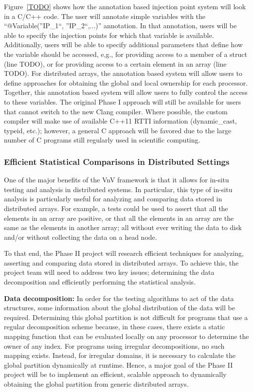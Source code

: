 Figure~\ref{TODO} shows how the annotation based injection point system will look in a C/C++ code. The user will annotate simple variables with the ``@Variable(''IP\_1``, ''IP\_2``,...)'' annotation. In that annotation, users will be able to specify the injection points for which that variable is available. Additionally, users will be able to specify additional parameters that define how the variable should be accessed, e,g., for providing access to a member of a struct (line TODO), or for providing access to a certain element in an array (line TODO). For distributed arrays, the annotation based system will allow users to define approaches for obtaining the global and local ownership for each processor. Together, this annotation based system will allow users to fully control the access to these variables. The original Phase I approach will still be available for users that cannot switch to the new Clang compiler. Where possible, the custom compiler will make use of available C++11 RTTI information (dynamic\_cast, typeid, etc.); however, a general C approach will be favored due to the large number of C programs still regularly used in scientific computing. 


\subsubsection{Efficient Statistical Comparisons in Distributed Settings} 

One of the major benefits of the VnV framework is that it allows for in-situ testing and analysis in distributed systems. In particular, this type of in-situ analysis is particularly useful for analyzing and comparing data stored in distributed arrays. For example, a tests could be used to assert that all the elements in an array are positive, or that all the elements in an array are the same as the elements in another array; all without ever writing the data to disk and/or without collecting the data on a head node. 

To that end, the Phase II project will research efficient techniques for analyzing, asserting and comparing data stored in distributed arrays. To achieve this, the project team will need to address two key issues; determining the data decomposition and efficiently performing the statistical analysis. 

{\bf Data decomposition:} In order for the testing algorithms to act of the data structures, some information about the global distribution of the data will be required. Determining this global partition is not difficult for programs that use a regular decomposition scheme because, in these cases, there exists a static mapping function that can be evaluated locally on any processor to determine the owner of any index. For programs using irregular decompositions, no such mapping exists. Instead, for irregular domains, it is necessary to calculate the global partition dynamically at runtime. Hence, a major goal of the Phase II project will be to implement an efficient, scalable approach to dynamically obtaining the global partition from generic distributed arrays. 

